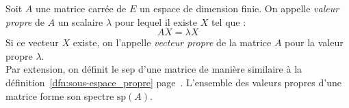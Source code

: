 \documentclass[11pt,a4paper,fleqn,pdftex]{report}
\begin{document}
\begin{dfn}
		Soit $A$ une matrice carrée de $E$ un espace de dimension finie. \newline
		On appelle \emph{valeur propre} de $A$ un scalaire $\lambda$ pour lequel il existe $X$ tel que :
		\begin{equation}
			  AX = \lambda X
        \end{equation}
        Si ce vecteur $X$ existe, on l'appelle \emph{vecteur propre} de la matrice $A$ pour la valeur propre $\lambda$.\\[\baselineskip]
        Par extension, on définit le \gls{sep} d'une matrice de manière similaire à la définition~\ref{dfn:sous-espace_propre} page~\pageref{dfn:sous-espace_propre}. L'ensemble des valeurs propres d'une matrice forme son spectre $\mathrm{sp}(A)$.
\end{dfn}
\end{document}
